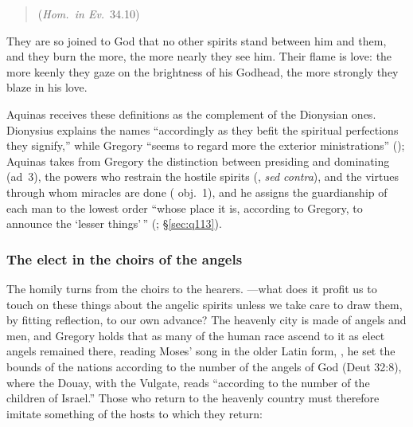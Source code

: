 \begin{quote}
 (\emph{Hom.\ in
Ev.}\ 34.10)
\end{quote}

\noindent They are so joined to God that no other spirits stand between him
and them, and they burn the more, the more nearly they see him. Their flame
is love: the more keenly they gaze on the brightness of his Godhead, the more
strongly they blaze in his love.

Aquinas receives these definitions as the complement of the Dionysian ones.
Dionysius explains the names ``accordingly as they befit the spiritual
perfections they signify,'' while Gregory ``seems to regard more the
exterior ministrations'' (); Aquinas takes from Gregory the
distinction between presiding and dominating (ad~3), the powers who restrain
the hostile spirits (, \emph{sed contra}), and the virtues
through whom miracles are done ( obj.~1), and he assigns
the guardianship of each man to the lowest order ``whose place it is,
according to Gregory, to announce the `lesser things'\,'' (;
\S\ref{sec:q113}).

\subsubsection{The elect in the choirs of the angels}

The homily turns from the choirs to the hearers. ---what does it profit us
to touch on these things about the angelic spirits unless we take care to
draw them, by fitting reflection, to our own advance? The heavenly city is
made of angels and men, and Gregory holds that as many of the human race
ascend to it as elect angels remained there, reading Moses' song in the
older Latin form, , he set the bounds of the nations according to the number of the angels
of God (Deut 32:8), where the Douay, with the Vulgate, reads
``according to the number of the children of Israel.'' Those who return to
the heavenly country must therefore imitate something of the hosts to which
they return:

